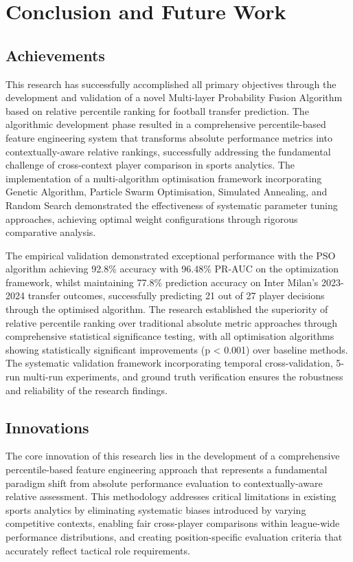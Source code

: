\section{Conclusion and Future Work}

\subsection{Achievements}

This research has successfully accomplished all primary objectives through the development and validation of a novel Multi-layer Probability Fusion Algorithm based on relative percentile ranking for football transfer prediction. The algorithmic development phase resulted in a comprehensive percentile-based feature engineering system that transforms absolute performance metrics into contextually-aware relative rankings, successfully addressing the fundamental challenge of cross-context player comparison in sports analytics. The implementation of a multi-algorithm optimisation framework incorporating Genetic Algorithm, Particle Swarm Optimisation, Simulated Annealing, and Random Search demonstrated the effectiveness of systematic parameter tuning approaches, achieving optimal weight configurations through rigorous comparative analysis.

The empirical validation demonstrated exceptional performance with the PSO algorithm achieving 92.8\% accuracy with 96.48\% PR-AUC on the optimization framework, whilst maintaining 77.8\% prediction accuracy on Inter Milan's 2023-2024 transfer outcomes, successfully predicting 21 out of 27 player decisions through the optimised algorithm. The research established the superiority of relative percentile ranking over traditional absolute metric approaches through comprehensive statistical significance testing, with all optimisation algorithms showing statistically significant improvements (p < 0.001) over baseline methods. The systematic validation framework incorporating temporal cross-validation, 5-run multi-run experiments, and ground truth verification ensures the robustness and reliability of the research findings.

\subsection{Innovations}

The core innovation of this research lies in the development of a comprehensive percentile-based feature engineering approach that represents a fundamental paradigm shift from absolute performance evaluation to contextually-aware relative assessment. This methodology addresses critical limitations in existing sports analytics by eliminating systematic biases introduced by varying competitive contexts, enabling fair cross-player comparisons within league-wide performance distributions, and creating position-specific evaluation criteria that accurately reflect tactical role requirements.

